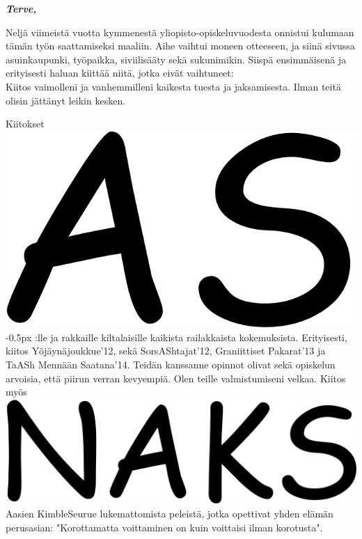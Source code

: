 \documentclass[english, 12pt, a4paper, elec, utf8, a-1b, online]{aaltothesis}
\begin{document}

\textbf{\textit{Terve,}}


\bigskip
\bigskip

\noindent
Neljä viimeistä vuotta kymmenestä yliopisto-opiskeluvuodesta
onnistui kulumaan tämän työn saattamiseksi maaliin.
Aihe vaihtui moneen otteeseen, ja siinä sivussa asuinkaupunki, työpaikka, siviilisääty sekä sukunimikin.
Siispä ensimmäisenä ja erityisesti haluan kiittää niitä, jotka eivät vaihtuneet:\\
Kiitos vaimolleni ja vanhemmilleni kaikesta tuesta ja jaksamisesta.
Ilman teitä olisin jättänyt leikin kesken.

\bigskip

\noindent
Kiitokset
\includegraphics[height=\fontcharht\font`\B]{appendices/comic-as}\kern-0.5px
:lle ja rakkaille kiltalaisille kaikista railakkaista kokemuksista.
Erityisesti, kiitos Yöjäynäjoukkue'12, sekä SorsAShtajat'12, Graniittiset Pakarat'13 ja TaASh Mennään Saatana'14.
Teidän kanssanne opinnot olivat sekä opiskelun arvoisia, että piirun verran kevyempiä.
Olen teille valmistumiseni velkaa.
Kiitos myös
\includegraphics[height=\fontcharht\font`\B]{appendices/comic-naks}
Aasien KimbleSeurue lukemattomista peleistä,
jotka opettivat yhden elämän perusasian: "Korottamatta voittaminen on kuin voittaisi ilman korotusta".
\end{document}
